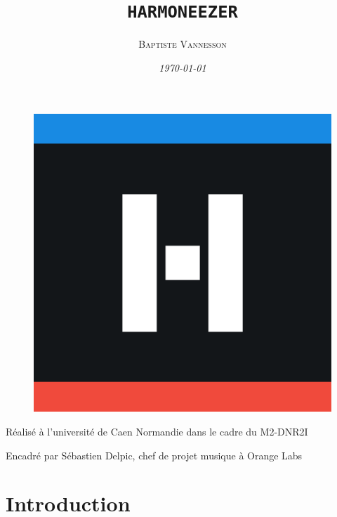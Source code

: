 \documentclass[a4paper,12pt]{article}
\title{\textbf{\texttt{HARMONEEZER}}}
\author{\textsc{Baptiste Vannesson}}
\date{\textit{\today}}
\begin{document}
\maketitle

\begin{figure}[!h]
  \begin{center}
    \includegraphics[scale=0.1]{logo-harmoneezer.png}
  \end{center}
\end{figure}

\begin{center}
  Réalisé à l'université de Caen Normandie dans le cadre du M2-DNR2I
  
  Encadré par Sébastien Delpic, chef de projet musique à Orange Labs
\end{center}

\newpage
\tableofcontents
\newpage
\listoffigures
\listoftables
\newpage


\part*{Introduction}
\end{document}
